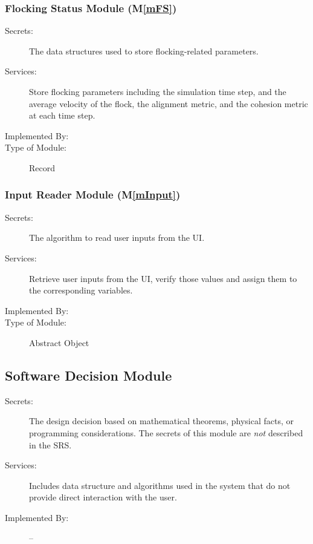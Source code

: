 \documentclass[12pt, titlepage]{article}
\newcommand{\mref}[1]{M\ref{#1}}
\begin{document}
\subsubsection{Flocking Status Module (\mref{mFS})}

\begin{description}
\item[Secrets:] The data structures used to store flocking-related parameters.
\item[Services:] Store flocking parameters including the simulation time step, 
and the average velocity of the flock, the alignment metric, and the cohesion 
metric at each time step.
\item[Implemented By:] \progname{}
\item[Type of Module:] Record
\end{description}

\subsubsection{Input Reader Module (\mref{mInput})}

\begin{description}
\item[Secrets:] The algorithm to read user inputs from the UI. 
\item[Services:] Retrieve user inputs from the UI, verify those values and 
assign them to the corresponding variables.
\item[Implemented By:] \progname{}
\item[Type of Module:] Abstract Object
\end{description}

\subsection{Software Decision Module}

\begin{description}
\item[Secrets:] The design decision based on mathematical theorems, physical
  facts, or programming considerations. The secrets of this module are
  \emph{not} described in the SRS.
\item[Services:] Includes data structure and algorithms used in the system that
  do not provide direct interaction with the user. 
\item[Implemented By:] --
\end{description}
\end{document}
